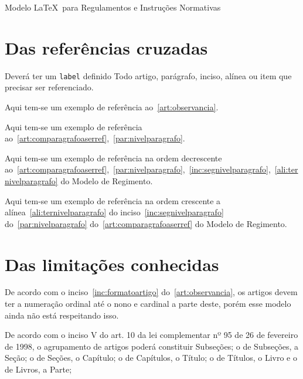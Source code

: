 \documentclass[11pt,twoside,a4paper]{inifsc}
\begin{document}
\begin{normativa}{Modelo \LaTeX~para Regulamentos e Instruções Normativas}
\section{Das referências cruzadas}

\begin{artigo}
    \item Deverá ter um \texttt{label} definido Todo artigo, parágrafo, inciso, alínea ou item que precisar ser referenciado.
    \begin{paragrafo}
        \item Aqui tem-se um exemplo de referência ao~\ref{art:observancia}.
        \item Aqui tem-se um exemplo de referência ao~\ref{art:comparagrafoaserref},~\ref{par:nivelparagrafo}.
        \item Aqui tem-se um exemplo de referência na ordem decrescente ao~\ref{art:comparagrafoaserref},~\ref{par:nivelparagrafo},~\ref{inc:segnivelparagrafo},~\ref{ali:ternivelparagrafo} do Modelo de Regimento.
        \item Aqui tem-se um exemplo de referência na ordem crescente a alínea~\ref{ali:ternivelparagrafo} do inciso~\ref{inc:segnivelparagrafo} do~\ref{par:nivelparagrafo} do~\ref{art:comparagrafoaserref} do Modelo de Regimento.
    \end{paragrafo}
\end{artigo}


\section{Das limitações conhecidas}

\begin{artigo}
    \item De acordo com o inciso~\ref{inc:formatoartigo} do~\ref{art:observancia}, os artigos devem ter a numeração ordinal até o nono e cardinal a parte deste, porém esse modelo ainda não está respeitando isso.
    \item De acordo com o inciso V do art. 10 da lei complementar nº 95 de 26 de fevereiro de 1998, o agrupamento de artigos poderá constituir Subseções; o de Subseções, a Seção; o de Seções, o Capítulo; o de Capítulos, o Título; o de Títulos, o Livro e o de Livros, a Parte;
    
\end{artigo}

\end{normativa}
\end{document}
